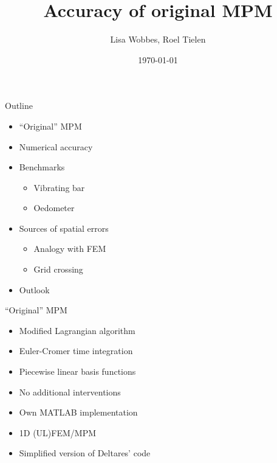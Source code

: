 \documentclass[mathserif,professionalfont,hyperref={pdfpagelabels=false}]{beamer}
\title[Accuracy of original MPM]{Accuracy of original MPM}
\author[]{Lisa Wobbes, Roel Tielen}
\date[\today]{\today}
\begin{document}
{
\frame{\titlepage}
}

\begin{frame}{Outline}
\begin{itemize}
\item ``Original'' MPM
\item Numerical accuracy
\item Benchmarks
	\begin{itemize}
	\item Vibrating bar 
	\item Oedometer
	\end{itemize}
\item Sources of spatial errors
\begin{itemize}
\item Analogy with FEM
\item Grid crossing
\end{itemize}
\item Outlook
\end{itemize}
\end{frame}

\begin{frame}{``Original'' MPM}
\begin{itemize}
\item Modified Lagrangian algorithm
\item Euler-Cromer time integration
\item Piecewise linear basis functions
\item No additional interventions
\pause
\item Own MATLAB implementation
\item 1D (UL)FEM/MPM 
\item Simplified version of Deltares' code
\end{itemize}
\end{frame}
\end{document}

